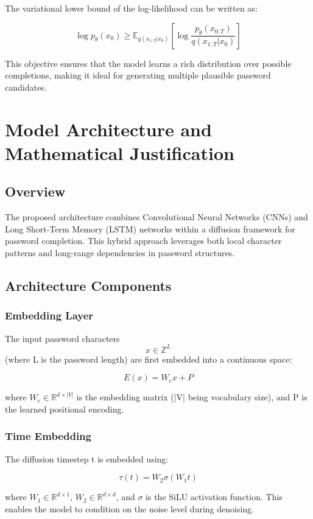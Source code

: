 The variational lower bound of the log-likelihood can be written as:

$$\log p_\theta(x_0) \geq \mathbb{E}_{q(x_{1:T}|x_0)}\left[\log \frac{p_\theta(x_{0:T})}{q(x_{1:T}|x_0)}\right]$$

This objective ensures that the model learns a rich distribution over possible completions, making it ideal for generating multiple plausible password candidates.

\section{Model Architecture and Mathematical Justification}

\subsection{Overview}
The proposed architecture combines Convolutional Neural Networks (CNNs) and Long Short-Term Memory (LSTM) networks within a diffusion framework for password completion. This hybrid approach leverages both local character patterns and long-range dependencies in password structures.

\subsection{Architecture Components}

\subsubsection{Embedding Layer}
The input password characters $$x \in \mathbb{Z}^{L}$$ (where L is the password length) are first embedded into a continuous space:

$$E(x) = W_e x + P$$

where $W_e \in \mathbb{R}^{d \times |V|}$ is the embedding matrix (|V| being vocabulary size), and P is the learned positional encoding.

\subsubsection{Time Embedding}
The diffusion timestep t is embedded using:

$$\tau(t) = W_2\sigma(W_1t)$$

where $W_1 \in \mathbb{R}^{d \times 1}$, $W_2 \in \mathbb{R}^{d \times d}$, and $\sigma$ is the SiLU activation function. This enables the model to condition on the noise level during denoising.

